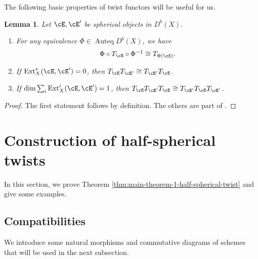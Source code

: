 \documentclass[12pt]{amsart}
\numberwithin{equation}{section}
\theoremstyle{plain}
\newtheorem{lemma}[theorem]{Lemma}
\theoremstyle{definition}
\DeclareMathOperator{\Auteq}{\mathrm{Auteq}}
\DeclareMathOperator{\Ext}{\mathrm{Ext}}
\begin{document}
The following basic properties of twist functors will be useful for us.
\begin{lemma}
    Let $\cE, \cE'$ be spherical objects in $D^b(X)$.
    \begin{enumerate}
        \item For any equivalence $\Phi \in \Auteq{D^b(X)}$, we have \begin{equation}
                  \Phi \circ T_{\cE} \circ \Phi^{-1} \cong T_{\Phi(\cE)}.
              \end{equation}
        \item If $\Ext^*_X(\cE, \cE') = 0$, then $T_{\cE}T_{\cE'} \cong T_{\cE'}T_{\cE}$.
        \item If $\dim \sum_i \Ext_X^i(\cE, \cE') = 1$, then $T_{\cE}T_{\cE'} T_{\cE} \cong T_{\cE'}T_{\cE}T_{\cE'}$.
    \end{enumerate}
\end{lemma}
\begin{proof}
    The first statement follows by definition.
    The others are part of \cite[Theorem 1.2]{MR1831820}.
\end{proof}





\section{Construction of half-spherical twists}\label{section:construction-of-half-spherical-twists}
In this section, we prove Theorem \ref{thm:main-theorem-1-half-spherical-twist} and give some examples.
\subsection{Compatibilities}
We introduce some natural morphisms and commutative diagrams of schemes that will be used in the next subsection.
\end{document}
